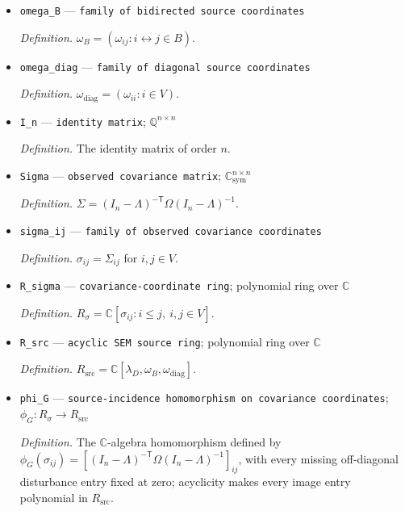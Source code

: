 \documentclass{article}
\begin{document}
\begin{itemize}
  \par\smallskip\noindent\emph{Definition.} \texttt{The symmetric disturbance matrix before its graph-\allowbreak{}support restriction is imposed.}
  \item \texttt{omega\_\allowbreak{}B} --- \texttt{family of bidirected source coordinates}
  \par\smallskip\noindent\emph{Definition.} \(\omega_B=(\omega_{ij}:i\leftrightarrow j\in B)\).
  \item \texttt{omega\_\allowbreak{}diag} --- \texttt{family of diagonal source coordinates}
  \par\smallskip\noindent\emph{Definition.} \(\omega_{\mathrm{diag}}=(\omega_{ii}:i\in V)\).
  \item \texttt{I\_\allowbreak{}n} --- \texttt{identity matrix}; \(\mathbb Q^{n\times n}\)
  \par\smallskip\noindent\emph{Definition.} The identity matrix of order \(n\).
  \item \texttt{Sigma} --- \texttt{observed covariance matrix}; \(\mathbb C^{n\times n}_{\mathrm{sym}}\)
  \par\smallskip\noindent\emph{Definition.} \(\Sigma=(I_n-\Lambda)^{-\mathsf T}\Omega(I_n-\Lambda)^{-1}\).
  \item \texttt{sigma\_\allowbreak{}ij} --- \texttt{family of observed covariance coordinates}
  \par\smallskip\noindent\emph{Definition.} \(\sigma_{ij}=\Sigma_{ij}\) for \(i,j\in V\).
  \item \texttt{R\_\allowbreak{}sigma} --- \texttt{covariance-\allowbreak{}coordinate ring}; polynomial ring over \(\mathbb C\)
  \par\smallskip\noindent\emph{Definition.} \(R_{\sigma}=\mathbb C[\sigma_{ij}:i\le j,\ i,j\in V]\).
  \item \texttt{R\_\allowbreak{}src} --- \texttt{acyclic SEM source ring}; polynomial ring over \(\mathbb C\)
  \par\smallskip\noindent\emph{Definition.} \(R_{\mathrm{src}}=\mathbb C[\lambda_D,\omega_B,\omega_{\mathrm{diag}}]\).
  \item \texttt{phi\_\allowbreak{}G} --- \texttt{source-\allowbreak{}incidence homomorphism on covariance coordinates}; \(\phi_G:R_{\sigma}\to R_{\mathrm{src}}\)
  \par\smallskip\noindent\emph{Definition.} The \(\mathbb C\)-algebra homomorphism defined by \(\phi_G(\sigma_{ij})=[(I_n-\Lambda)^{-\mathsf T}\Omega(I_n-\Lambda)^{-1}]_{ij}\), with every missing off-diagonal disturbance entry fixed at zero; acyclicity makes every image entry polynomial in \(R_{\mathrm{src}}\).

\end{itemize}
\end{document}

